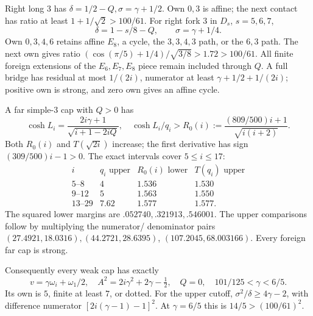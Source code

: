 \documentclass[11pt]{article}
\theoremstyle{definition}
\theoremstyle{remark}
\begin{document}
Right long \(3\) has
\(\delta=1/2-Q,\sigma=\gamma+1/2\).
Own \(0,3\) is affine; the next contact has ratio
at least \(1+1/\sqrt2>100/61\).
For right fork \(3\) in \(D_s\), \(s=5,6,7\),
\[
 \delta=1-s/8-Q,\qquad \sigma=\gamma+1/4.
\]
Own \(0,3,4,6\) retains affine \(E_8\), a cycle,
the \(3,3,4,3\) path, or the \(6,3\) path.
The next own gives ratio
\((\cos(\pi/5)+1/4)/\sqrt{3/8}>1.72>100/61\).
All finite foreign extensions of the \(E_6,E_7,E_8\)
piece remain included through \(Q\).
A full bridge has residual at most \(1/(2i)\),
numerator at least \(\gamma+1/2+1/(2i)\);
positive own is strong, and zero own gives an affine cycle.

A far simple-\(3\) cap with \(Q>0\) has
\[
 \cosh L_i=\frac{2i\gamma+1}{\sqrt{i+1-2iQ}},\quad
 \cosh L_i/q_i>R_0(i)
 :=\frac{(809/500)i+1}{\sqrt{i(i+2)}}.
\]
Both \(R_0(i)\) and \(T(\sqrt{2i})\) increase;
the first derivative has sign \((309/500)i-1>0\).
The exact intervals cover \(5\leq i\leq17\):
\[
\begin{array}{c|c|c|c}
i&q_i\text{ upper}&R_0(i)\text{ lower}&T(q_i)\text{ upper}\\ \hline
5\text{--}8&4&1.536&1.530\\
9\text{--}12&5&1.563&1.550\\
13\text{--}29&7.62&1.577&1.577.
\end{array}
\]
The squared lower margins are \(.052740,.321913,.546001\).
The upper comparisons follow by multiplying the numerator/
denominator pairs
\((27.4921,18.0316),(44.2721,28.6395)\),
\((107.2045,68.003166)\).
Every foreign far cap is strong.

Consequently every weak cap has exactly
\begin{equation}\label{app:eq:pureprefix}
 v=\gamma\omega_i+\omega_1/2,\quad
 A^2=2i\gamma^2+2\gamma-\tfrac12,\quad Q=0,\quad
 101/125<\gamma<6/5.
\end{equation}
Its own is \(5\), finite at least \(7\), or dotted.
For the upper cutoff,
\(\sigma^2/\delta\geq4\gamma-2\), with difference
numerator \([2i(\gamma-1)-1]^2\).
At \(\gamma=6/5\) this is
\(14/5>(100/61)^2\).
\end{document}
